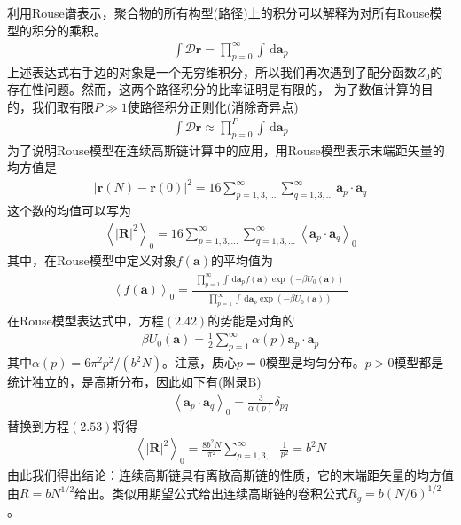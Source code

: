 利用Rouse谱表示，聚合物的所有构型(路径)上的积分可以解释为对所有Rouse模型的积分的乘积。
\begin{gather}
\int \mathcal{D}\mathbf{r}= \prod_{p=0}^{\infty} \int \, \mathrm{d} \mathbf{a}_p
\end{gather}
上述表达式右手边的对象是一个无穷维积分，所以我们再次遇到了配分函数$Z_0$的存在性问题。然而，这两个路径积分的比率证明是有限的，
为了数值计算的目的，我们取有限$P\gg1$使路径积分正则化(消除奇异点)
\begin{gather}
\int \mathcal{D}\mathbf{r}\approx \prod_{p=0}^{P} \int \, \mathrm{d} \mathbf{a}_p\end{gather}
为了说明Rouse模型在连续高斯链计算中的应用，用Rouse模型表示末端距矢量的均方值是
\begin{gather}
\left | \mathbf{r}(N)-\mathbf{r}(0) \right |^2=16\sum_{p=1,3,...}^{\infty}\sum_{q=1,3,...}^{\infty} \mathbf{a}_p \cdot \mathbf{a}_q
\end{gather}
这个数的均值可以写为
\begin{gather}
\left \langle \left| \mathbf{R} \right|^2 \right \rangle _0=16\sum_{p=1,3,...}^{\infty}\sum_{q=1,3,...}^{\infty} \left \langle \mathbf{a}_p \cdot \mathbf{a}_q \right \rangle _0
\end{gather}
其中，在Rouse模型中定义对象$f(\mathbf{a})$的平均值为
\begin{gather}
\left \langle f(\mathbf{a}) \right \rangle _0=\frac{\begin{matrix} \prod_{p=1}^{\infty} \int \, \mathrm{d} \mathbf{a}_p f(\mathbf{a})\exp(-\beta U_0(\mathbf{a})) \end{matrix}}{\begin{matrix} \prod_{p=1}^{\infty} \int \, \mathrm{d} \mathbf{a}_p \exp(-\beta U_0(\mathbf{a})) \end{matrix}}
\end{gather}
在Rouse模型表达式中，方程$(2.42)$的势能是对角的
\begin{gather}
\beta U_0(\mathbf{a})=\frac{1}{2}\sum_{p=1}^{\infty}\alpha (p)\mathbf{a}_p \cdot \mathbf{a}_p
\end{gather}
其中$\alpha (p)=6\pi ^2p^2/(b^2N)$。注意，质心$p=0$模型是均匀分布。$p>0$模型都是统计独立的，是高斯分布，因此如下有(附录B)
\begin{gather}
\left \langle \mathbf{a}_p \cdot \mathbf{a}_q \right \rangle _0=\frac{3}{\alpha (p)}\delta _{pq}
\end{gather}
替换到方程$(2.53)$将得
\begin{gather}
\left \langle \left| \mathbf{R} \right|^2 \right \rangle _0=\frac{8b^2N}{\pi ^2}\sum_{p=1,3,...}^{\infty}\frac{1}{p^2}=b^2N
\end{gather}
由此我们得出结论：连续高斯链具有离散高斯链的性质，它的末端距矢量的均方值由$R=bN^{1/2}$给出。类似用期望公式给出连续高斯链的卷积公式$R_g=b(N/6)^{1/2}$。

